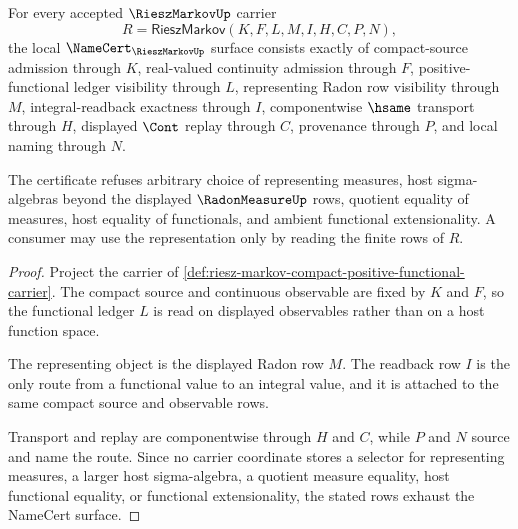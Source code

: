 \begin{theorem}
\label{thm:riesz-markov-namecert-obligations}
For every accepted $\RieszMarkovUp$ carrier
$$
R=\mathsf{RieszMarkov}(K,F,L,M,I,H,C,P,N),
$$
the local $\NameCert_{\RieszMarkovUp}$ surface consists exactly of compact-source admission through $K$, real-valued continuity admission through $F$, positive-functional ledger visibility through $L$, representing Radon row visibility through $M$, integral-readback exactness through $I$, componentwise $\hsame$ transport through $H$, displayed $\Cont$ replay through $C$, provenance through $P$, and local naming through $N$.

The certificate refuses arbitrary choice of representing measures, host sigma-algebras beyond the displayed $\RadonMeasureUp$ rows, quotient equality of measures, host equality of functionals, and ambient functional extensionality. A consumer may use the representation only by reading the finite rows of $R$.
\end{theorem}
\begin{proof}
Project the carrier of \autoref{def:riesz-markov-compact-positive-functional-carrier}. The compact source and continuous observable are fixed by $K$ and $F$, so the functional ledger $L$ is read on displayed observables rather than on a host function space.

The representing object is the displayed Radon row $M$. The readback row $I$ is the only route from a functional value to an integral value, and it is attached to the same compact source and observable rows.

Transport and replay are componentwise through $H$ and $C$, while $P$ and $N$ source and name the route. Since no carrier coordinate stores a selector for representing measures, a larger host sigma-algebra, a quotient measure equality, host functional equality, or functional extensionality, the stated rows exhaust the NameCert surface.
\end{proof}


